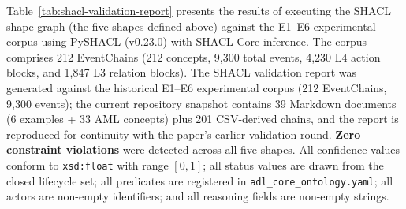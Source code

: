 Table~\ref{tab:shacl-validation-report} presents the results of executing the SHACL shape graph (the five shapes defined above) against the E1--E6 experimental corpus using PySHACL (v0.23.0) with SHACL-Core inference. The corpus comprises 212 EventChains (212 concepts, 9,300 total events, 4,230 L4 action blocks, and 1,847 L3 relation blocks). The SHACL validation report was generated against the historical E1--E6 experimental corpus (212 EventChains, 9,300 events); the current repository snapshot contains 39 Markdown documents (6 examples + 33 AML concepts) plus 201 CSV-derived chains, and the report is reproduced for continuity with the paper's earlier validation round. \textbf{Zero constraint violations} were detected across all five shapes. All confidence values conform to \texttt{xsd:float} with range $[0,1]$; all status values are drawn from the closed lifecycle set; all predicates are registered in \texttt{adl\_core\_ontology.yaml}; all actors are non-empty identifiers; and all reasoning fields are non-empty strings.
